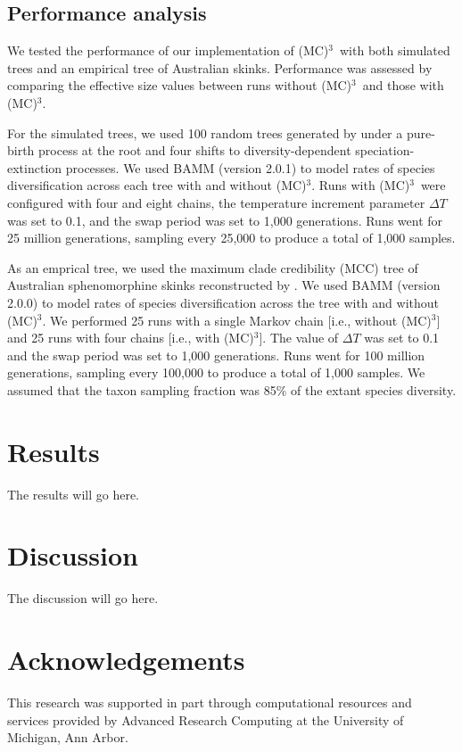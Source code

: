 \documentclass[12pt]{article}
\newcommand{\MCMCMC}{(MC)$^{3}$}
\begin{document}
\subsection*{Performance analysis}

We tested the performance of our implementation of \MCMCMC\ 
with both simulated trees and an empirical tree of Australian skinks.
%
Performance was assessed by comparing the effective size values
between runs without \MCMCMC\ and those with \MCMCMC.


For the simulated trees, we used 100 random trees generated by \citet{rab14plos}
under a pure-birth process at the root and four shifts
to diversity-dependent speciation-extinction processes.
%
We used BAMM (version 2.0.1) to model rates of species diversification
across each tree with and without \MCMCMC.
%
Runs with \MCMCMC\ were configured with four and eight chains,
the temperature increment parameter $\Delta T$ was set to 0.1,
and the swap period was set to 1,000 generations.
%
Runs went for 25 million generations,
sampling every 25,000 to produce a total of 1,000 samples.


As an emprical tree, we used the maximum clade credibility (MCC) tree
of Australian sphenomorphine skinks reconstructed by \citet{rab14sysbio}.
%
We used BAMM (version 2.0.0) to model rates of species diversification
across the tree with and without \MCMCMC.
%
We performed 25 runs with a single Markov chain [i.e., without \MCMCMC]
and 25 runs with four chains [i.e., with \MCMCMC].
%
The value of $\Delta T$ was set to 0.1
and the swap period was set to 1,000 generations.
%
Runs went for 100 million generations,
sampling every 100,000 to produce a total of 1,000 samples.
%
We assumed that the taxon sampling fraction was 85\%
of the extant species diversity.


\section*{Results}

The results will go here.


\section*{Discussion}

The discussion will go here.


\section*{Acknowledgements}

This research was supported in part through computational resources
and services provided by Advanced Research Computing
at the University of Michigan, Ann Arbor.



\end{document}
